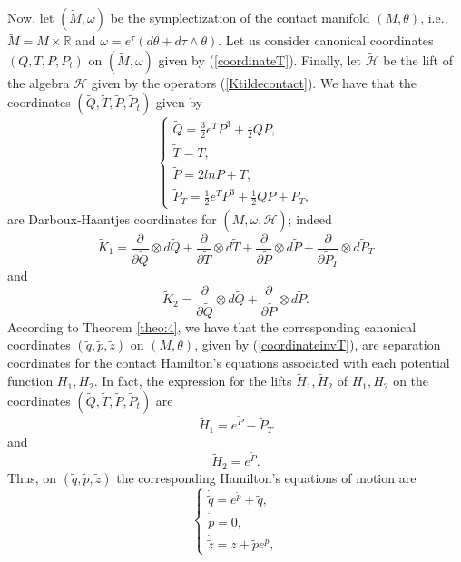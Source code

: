 \documentclass[10pt]{amsart}
\numberwithin{equation}{section}
\theoremstyle{definition}
\begin{document}
Now, let   $(\tilde{M},\omega)$ be the symplectization of the contact manifold $(M,\theta)$, i.e., $\tilde{M}=M\times\mathbb{R}$ and $\omega=e^{\tau}(d\theta+d\tau\wedge \theta).$ Let us consider  canonical coordinates $(Q,T,P,P_{t})$ on $(\tilde{M},\omega)$ given by (\ref{coordinateT}). Finally, let $\tilde{\mathscr{H}}$ be the lift of the algebra $\mathscr{H}$ given by the operators (\ref{Ktildecontact}). We have that the coordinates $(\tilde{Q},\tilde{T},\tilde{P},\tilde{P}_{t})$ given by
\begin{equation}
\left\lbrace\begin{array}{c}
\tilde{Q}=\frac{3}{2}e^{T}P^{3}+\frac{1}{2}QP,\\
\tilde{T}=T,\\
\tilde{P}=2lnP+T,\\
\tilde{P}_{T}=\frac{1}{2}e^{T}P^{3}+\frac{1}{2}QP+P_{T},
\end{array}\right. 
\end{equation}
are Darboux-Haantjes coordinates for $(\tilde{M},\omega,\tilde{\mathscr{H}})$; indeed
\begin{equation}
\tilde{K}_{1}=\frac{\partial}{\partial \tilde{Q}}\otimes d\tilde{Q}+\frac{\partial}{\partial \tilde{T}}\otimes d\tilde{T}+\frac{\partial}{\partial \tilde{P}}\otimes d\tilde{P}+\frac{\partial}{\partial \tilde{P}_{T}}\otimes d\tilde{P}_{T}
\end{equation}
and
\begin{equation}
\tilde{K}_{2}=\frac{\partial}{\partial \tilde{Q}}\otimes d\tilde{Q}+\frac{\partial}{\partial \tilde{P}}\otimes d\tilde{P}.
\end{equation}
According to Theorem \ref{theo:4}, we have that the corresponding canonical coordinates $(\tilde{q},\tilde{p},\tilde{z})$ on $(M,\theta)$, given by (\ref{coordinateinvT}), are separation coordinates for the contact Hamilton's equations associated with each potential function $H_{1},H_{2}$. In fact, the expression for the lifts $\tilde{H}_{1},\tilde{H}_{2}$ of $H_{1},H_{2}$ on the coordinates $(\tilde{Q},\tilde{T},\tilde{P},\tilde{P}_{t})$ are
\begin{equation}
\tilde{H}_{1}=e^{\tilde{P}}-\tilde{P}_{T}
\end{equation}
and
\begin{equation}
\tilde{H}_{2}=e^{\tilde{P}}.
\end{equation}
Thus, on $(\tilde{q},\tilde{p},\tilde{z})$ the corresponding Hamilton's equations of motion are
\begin{equation}
\left\lbrace\begin{array}{c}
\dot{\tilde{q}}=e^{\tilde{p}}+\tilde{q},\\
\dot{\tilde{p}}=0,\\
\dot{\tilde{z}}=z+\tilde{p}e^{\tilde{p}},
\end{array}\right. 
\end{equation}
\end{document}
